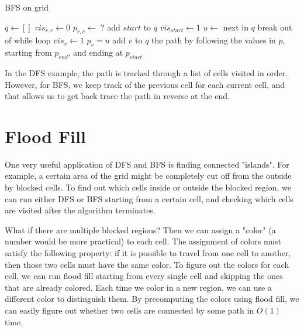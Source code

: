 \documentclass{article}
\begin{document}
    \begin{algorithm}[H]
        \caption{BFS on grid}
        \begin{algorithmic}[1]
                \State $q \gets []$
                \State $vis_{r, c} \gets 0$
                \State $p_{r, c} \gets $ ?
                \State add $start$ to $q$
                \State $vis_{start} \gets 1$
                    \State $u \gets$ next in $q$
                        \State break out of while loop
                    \EndIf
                            \State $vis_v \gets 1$
                            \State $p_v = u$
                            \State add $v$ to $q$
                        \EndIf
                    \EndFor
                \EndWhile
                \State \Return the path by following the values in $p$, starting from $p_{end}$, and ending at $p_{start}$
            \EndFunction
        \end{algorithmic}
    \end{algorithm}

    In the DFS example, the path is tracked through a list of cells visited in order. However, for BFS, we keep track of the previous cell for each current cell, and that allows us to get back trace the path in reverse at the end.

    \section{Flood Fill}
    One very useful application of DFS and BFS is finding connected "islands". For example, a certain area of the grid might be completely cut off from the outside by blocked cells. To find out which cells inside or outside the blocked region, we can run either DFS or BFS starting from a certain cell, and checking which cells are visited after the algorithm terminates.

    What if there are multiple blocked regions? Then we can assign a "color" (a number would be more practical) to each cell. The assignment of colors must satisfy the following property: if it is possible to travel from one cell to another, then those two cells must have the same color. To figure out the colors for each cell, we can run flood fill starting from every single cell and skipping the ones that are already colored. Each time we color in a new region, we can use a different color to distinguish them. By precomputing the colors using flood fill, we can easily figure out whether two cells are connected by some path in $O(1)$ time.
\end{document}
